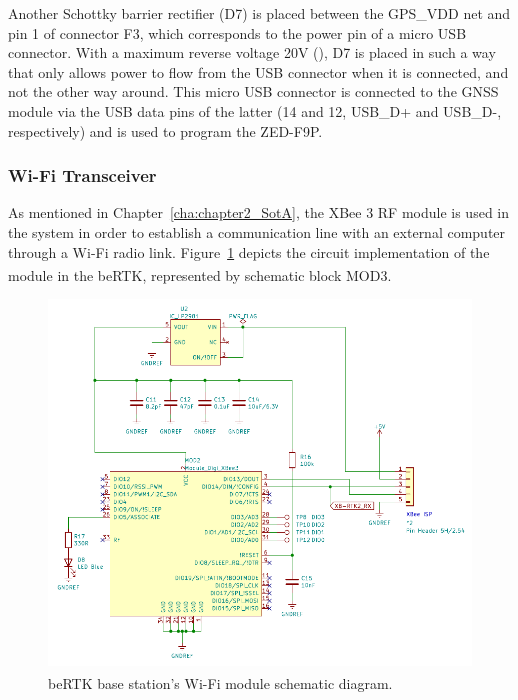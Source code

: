 Another Schottky barrier rectifier (D7) is placed between the GPS\_VDD net and pin 1 of connector F3, which corresponds to the power pin of a micro USB connector. With a maximum reverse voltage 20V (\cite{PMEG2010ER}), D7 is placed in such a way that only allows power to flow from the USB connector when it is connected, and not the other way around. This micro USB connector is connected to the GNSS module via the USB data pins of the latter (14 and 12, USB\_D+ and USB\_D-, respectively) and is used to program the ZED-F9P.



\subsubsection{Wi-Fi Transceiver}\label{sec:3233_XBEE3}

As mentioned in Chapter~\ref{cha:chapter2_SotA}, the XBee 3 RF module is used in the system in order to establish a communication line with an external computer through a Wi-Fi radio link. Figure~\ref{fig:XBEE3_circuit} depicts the circuit implementation of the module in the beRTK\textsuperscript{\textregistered}, represented by schematic block MOD3.

\begin{figure}[h]
	\centering
	\includegraphics[width=1.0\textwidth]{Chapters/Figures/chapter3/Modules_XBEE3.pdf}
	\caption{beRTK\textsuperscript{\textregistered} base station's Wi-Fi module schematic diagram.}
	\label{fig:XBEE3_circuit}
\end{figure}


